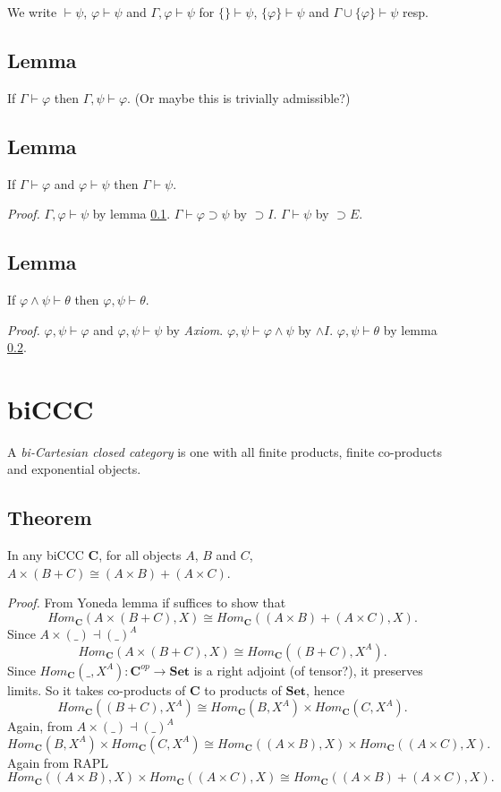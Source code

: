 \documentclass[a4paper,12pt]{paper}
\begin{document}
We write $\vdash \psi$, $\varphi \vdash \psi$ and $\Gamma, \varphi \vdash \psi$ for $\{\} \vdash \psi$, $\{\varphi\} \vdash \psi$ and $\Gamma \cup \{\varphi\} \vdash \psi$ resp.

\subsection{Lemma}\label{weakening} If $\Gamma \vdash \varphi$ then $\Gamma, \psi \vdash \varphi$. (Or maybe this is trivially admissible?)

\subsection{Lemma}\label{cut} If $\Gamma \vdash \varphi$ and $\varphi \vdash \psi$ then $\Gamma \vdash \psi$.

\textit{Proof.} $\Gamma, \varphi \vdash \psi$ by lemma \ref{weakening}. $\Gamma \vdash \varphi \supset \psi$ by $\supset I$. $\Gamma \vdash \psi$ by $\supset E$.

\subsection{Lemma}\label{context} If $\varphi \land \psi \vdash \theta$ then $\varphi, \psi \vdash \theta$.

\textit{Proof.} $\varphi,\psi \vdash \varphi$ and $\varphi,\psi \vdash \psi$ by \textit{Axiom}. $\varphi,\psi \vdash \varphi \land \psi$ by $\land I$. $\varphi,\psi \vdash \theta$ by lemma \ref{cut}.

\section{biCCC} A \emph{bi-Cartesian closed category} is one with all finite products, finite co-products and exponential objects.

\subsection{Theorem}\label{dist} In any biCCC $\mathbf{C}$, for all objects $A$, $B$ and $C$, $A \times (B + C) \cong (A \times B) +‌(A \times C)$.

\textit{Proof.} From Yoneda lemma if suffices to show that
\[ Hom_{\mathbf{C}}(A \times (B + C), X) \cong Hom_{\mathbf{C}}((A \times B) +‌(A \times C), X) .\]
Since $A \times (\_) \dashv (\_)^A$
\[ Hom_{\mathbf{C}}(A \times (B + C), X) \cong Hom_{\mathbf{C}}((B + C), X^A) .\]
Since $Hom_{\mathbf{C}}(\_, X^A) : \mathbf{C}^{op} \longrightarrow \mathbf{Set}$ is a right adjoint (of tensor?), it preserves limits. So it takes co-products of $\mathbf{C}$ to products of $\mathbf{Set}$, hence
\[ Hom_{\mathbf{C}}((B + C), X^A) \cong Hom_\mathbf{C}(B, X^A) \times Hom_\mathbf{C}(C, X^A). \]
Again, from $A \times (\_) \dashv (\_)^A$
\[  Hom_\mathbf{C}(B, X^A) \times Hom_\mathbf{C}(C, X^A) \cong  Hom_\mathbf{C}((A \times B), X) \times Hom_\mathbf{C}((A \times C), X). \]
Again from RAPL
\[ Hom_\mathbf{C}((A \times B), X) \times Hom_\mathbf{C}((A \times C), X) \cong Hom_{\mathbf{C}}((A \times B) +‌(A \times C), X). \]
\end{document}
